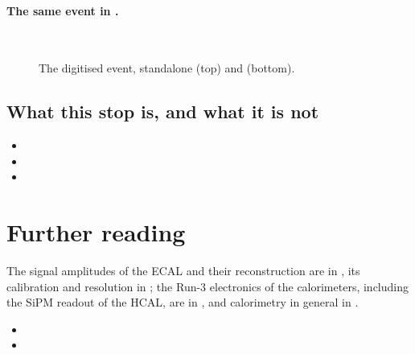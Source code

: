 \paragraph{The same event in \CMSSW.}
\label{sec:customs_form:cmssw_event}

\begin{figure}[p]\centering
{}\\[2mm]
\caption[The digitised event, standalone and \CMSSW]{The digitised event,
standalone (top) and \CMSSW (bottom). }
\label{fig:customs_form:displays}
\end{figure}

\subsection{What this stop is, and what it is not}
\label{sec:customs_form:caveats}
\begin{itemize}
  \item {}
  \item {}
  \item {}
\end{itemize}

\section{Further reading}
\label{sec:customs_form:further_reading}
The signal amplitudes of the ECAL and their reconstruction are in
\cite{CMS:2020uim}, its calibration and resolution in \cite{CMS:2013lxn};
the Run-3 electronics of the calorimeters, including the SiPM readout of the
HCAL, are in \cite{CMS:2024aqx}, and calorimetry in general in
\cite{Wigmans:2000vf}. 

\begin{pitfalls}
\begin{itemize}[nosep]
  \item {}
  \item {}
\end{itemize}
\end{pitfalls}

